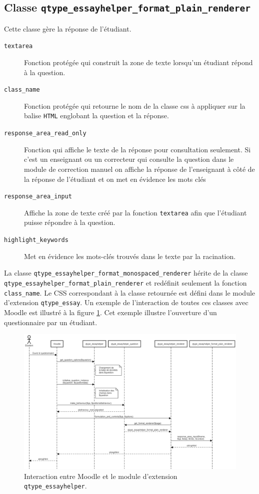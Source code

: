 \subsection*{Classe \texttt{qtype\_essayhelper\_format\_plain\_renderer}}
Cette classe g\`ere la r\'eponse de l'\'etudiant.
\begin{description}
  \item[\texttt{textarea}] Fonction prot\'eg\'ee qui construit la zone de texte lorsqu'un \'etudiant r\'epond \`a la question.
  \item[\texttt{class\_name}] Fonction prot\'eg\'ee qui retourne le nom de la classe css \`a appliquer sur la balise \texttt{HTML} englobant la question et la r\'eponse.
  \item[\texttt{response\_area\_read\_only}] Fonction qui affiche le texte de la r\'eponse pour consultation seulement. Si c'est un enseignant ou un correcteur qui consulte la question dans le module de correction manuel on affiche la r\'eponse de l'enseignant \`a c\^ot\'e de la r\'eponse de l'\'etudiant et on met en \'evidence les mots cl\'es
  \item[\texttt{response\_area\_input}] Affiche la zone de texte cr\'e\'e par la fonction \texttt{textarea} afin que l'\'etudiant puisse r\'epondre \`a la question.
  \item[\texttt{highlight\_keywords}] Met en \'evidence les mots-cl\'es trouv\'es dans le texte par la racination.
\end{description}
La classe \texttt{qtype\_essayhelper\_format\_monospaced\_renderer} h\'erite de la classe \texttt{qtype\_essayhelper\_format\_plain\_renderer} et red\'efinit seulement la fonction \texttt{class\_name}.
Le CSS correspondant \`a la classe retourn\'ee est d\'efini dans le module d'extension \texttt{qtype\_essay}.
Un exemple de l'interaction de toutes ces classes avec Moodle est illustr\'e \`a la figure \ref{dev-diagramme}.
Cet exemple illustre l'ouverture d'un questionnaire par un \'etudiant.
\begin{landscape}
\begin{figure}[h!]
  \includegraphics[scale=0.4]{images/diagramme-flux.png}
  \caption{Interaction entre Moodle et le module d'extension \texttt{qtype\_essayhelper}.}
  \label{dev-diagramme}
\end{figure}
\end{landscape}
